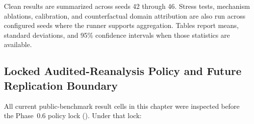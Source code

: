 \documentclass[11pt]{article}
\begin{document}
Clean results are summarized across seeds 42 through 46. Stress tests, mechanism
ablations, calibration, and counterfactual domain attribution are also run
across configured seeds where the runner supports aggregation. Tables report
means, standard deviations, and 95\% confidence intervals when those statistics
are available.

\subsection{Locked Audited-Reanalysis Policy and Future Replication Boundary}
\label{sec:thesis-audited-policy}

All current public-benchmark result cells in this chapter were
inspected before the Phase~0.6 policy lock
(). Under
that lock:
\end{document}
